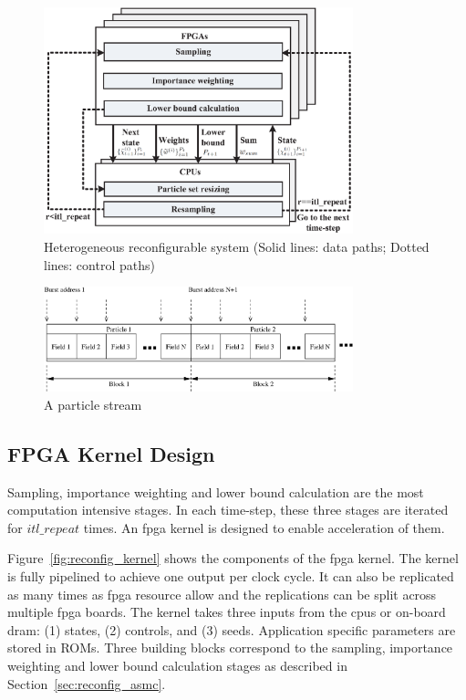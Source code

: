 \begin{figure}[t!]
\centering
\includegraphics[width=0.8\textwidth]{4_adaptation/figures/fig_arch}
\caption[Heterogeneous reconfigurable system]{Heterogeneous reconfigurable system (Solid lines: data paths; Dotted lines: control paths)}
\label{fig:reconfig_arch}
\end{figure}

\begin{figure}[t!]
\centering
\includegraphics[width=0.8\textwidth]{4_adaptation/figures/fig_particles}
\caption{A particle stream}
\label{fig:particles_stream}
\end{figure}

\subsection{FPGA Kernel Design}
Sampling, importance weighting and lower bound calculation are the most computation intensive stages.
In each time-step, these three stages are iterated for $itl\_repeat$ times.
An \gls{fpga} kernel is designed to enable acceleration of them.

Figure~\ref{fig:reconfig_kernel} shows the components of the \gls{fpga} kernel.
The kernel is fully pipelined to achieve one output per clock cycle.
It can also be replicated as many times as \gls{fpga} resource allow and the replications can be split across multiple \gls{fpga} boards.
The kernel takes three inputs from the \gls{cpu}s or on-board \gls{dram}: (1) states, (2) controls, and (3) seeds.
Application specific parameters are stored in ROMs.
Three building blocks correspond to the sampling, importance weighting and lower bound calculation stages as described in Section~\ref{sec:reconfig_asmc}.


